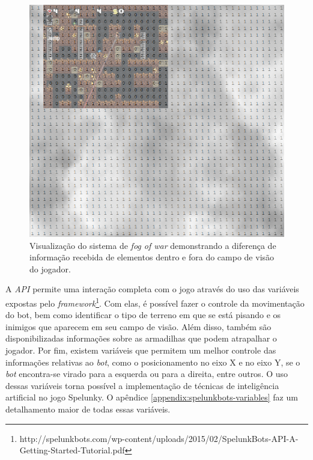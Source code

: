 \begin{figure}[htb!]
\centering
\includegraphics[width=.65\textwidth]{fig/spelunkbots-fow.png}
\caption {\label{fig:spelunkbots-fow}Visualização do sistema de \textit{fog of
war} demonstrando a diferença de informação recebida de elementos dentro e fora
do campo de visão do jogador.}
\end{figure}

A \textit{API} permite uma interação completa com o jogo através do uso
das variáveis expostas pelo
\textit{framework}\footnote{http://spelunkbots.com/wp-content/uploads/2015/02/SpelunkBots-API-A-Getting-Started-Tutorial.pdf}.
Com elas, é possível fazer o controle da movimentação do bot, bem
como identificar o tipo de terreno em que se está pisando e os inimigos que
aparecem em seu campo de visão. Além disso, também são disponibilizadas
informações sobre as armadilhas que podem atrapalhar o jogador. Por fim,
existem variáveis que permitem um melhor controle das informações relativas ao
\textit{bot}, como o posicionamento no eixo X e no eixo Y, se o \textit{bot}
encontra-se virado para a esquerda ou para a direita, entre outros. O uso dessas
variáveis torna possível a implementação de técnicas de inteligência artificial
no jogo Spelunky. O apêndice \ref{appendix:spelunkbots-variables} faz um
detalhamento maior de todas essas variáveis.
